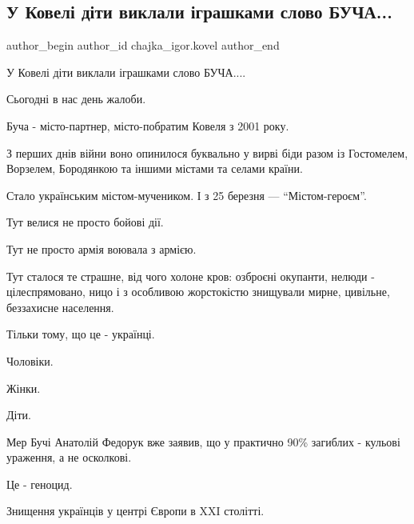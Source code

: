  
 
 
 
 
 
\subsection{У Ковелі діти виклали іграшками слово БУЧА...}
\label{sec:08_04_2022.fb.chajka_igor.kovel.1.kovel_deti_bucha}
 
\ifcmt
 author_begin
   author_id chajka_igor.kovel
 author_end
\fi

У Ковелі діти виклали іграшками слово БУЧА.... 

Сьогодні в нас день жалоби. 

Буча - місто-партнер, місто-побратим Ковеля з 2001 року. 

З перших днів війни воно опинилося буквально у вирві біди разом із Гостомелем,
Ворзелем,  Бородянкою та іншими містами та селами країни. 

Стало українським містом-мучеником. І з 25 березня — \enquote{Містом-героєм}.

Тут велися не просто бойові дії. 

Тут не просто армія воювала з армією. 


Тут сталося те страшне, від чого холоне кров: озброєні окупанти, нелюди -
цілеспрямовано, ницо і з особливою жорстокістю знищували мирне,  цивільне,
беззахисне населення. 

Тільки тому, що це - українці.

Чоловіки. 

Жінки. 

Діти. 

Мер Бучі Анатолій Федорук вже заявив, що у практично 90\% загиблих -  кульові
ураження, а не осколкові.

Це - геноцид. 

Знищення українців у центрі Європи в XXI столітті. 


